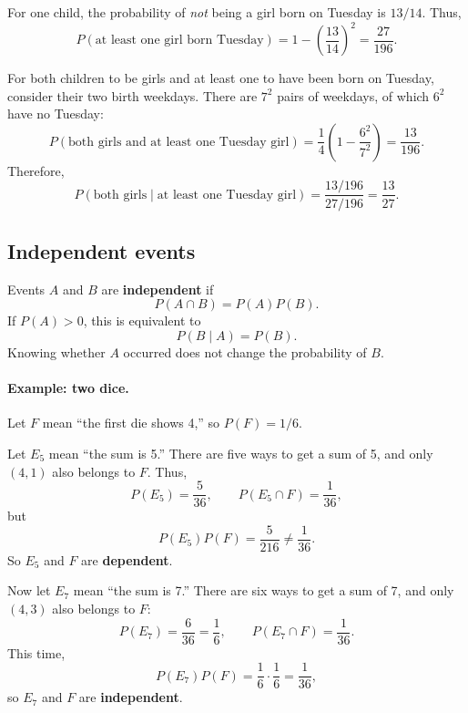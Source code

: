 \documentclass[11pt]{article}
\begin{document}
For one child, the probability of \emph{not} being a girl born on
Tuesday is $13/14$. Thus,
\[
P(\text{at least one girl born Tuesday})
=1-\left(\frac{13}{14}\right)^2
=\frac{27}{196}.
\]

For both children to be girls and at least one to have been born
on Tuesday, consider their two birth weekdays. There are $7^2$
pairs of weekdays, of which $6^2$ have no Tuesday:
\[
P(\text{both girls and at least one Tuesday girl})
=\frac14\left(1-\frac{6^2}{7^2}\right)
=\frac{13}{196}.
\]
Therefore,
\[
\boxed{
P(\text{both girls}\mid\text{at least one Tuesday girl})
=\frac{13/196}{27/196}
=\frac{13}{27}.
}
\]

\subsection{Independent events}

Events $A$ and $B$ are \textbf{independent} if
\[
\boxed{P(A\cap B)=P(A)P(B).}
\]
If $P(A)>0$, this is equivalent to
\[
P(B\mid A)=P(B).
\]
Knowing whether $A$ occurred does not change the probability of $B$.

\paragraph{Example: two dice.}
Let $F$ mean ``the first die shows 4,'' so $P(F)=1/6$.

Let $E_5$ mean ``the sum is 5.'' There are five ways to get a sum
of 5, and only $(4,1)$ also belongs to $F$. Thus,
\[
P(E_5)=\frac5{36},\qquad
P(E_5\cap F)=\frac1{36},
\]
but
\[
P(E_5)P(F)=\frac5{216}\ne\frac1{36}.
\]
So $E_5$ and $F$ are \textbf{dependent}.

Now let $E_7$ mean ``the sum is 7.'' There are six ways to get
a sum of 7, and only $(4,3)$ also belongs to $F$:
\[
P(E_7)=\frac6{36}=\frac16,\qquad
P(E_7\cap F)=\frac1{36}.
\]
This time,
\[
P(E_7)P(F)=\frac16\cdot\frac16=\frac1{36},
\]
so $E_7$ and $F$ are \textbf{independent}.
\end{document}
